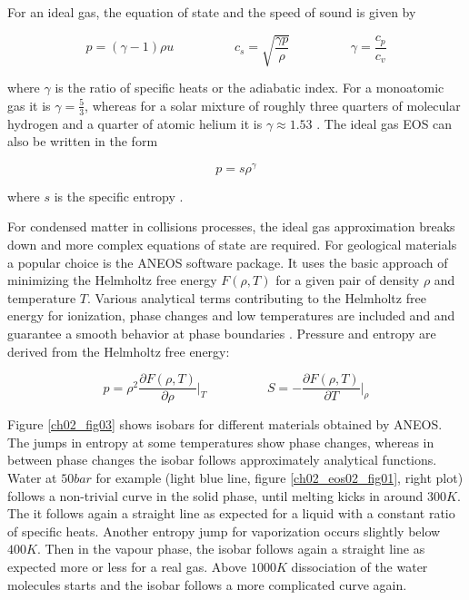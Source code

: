For an ideal gas, the equation of state and the speed of sound is given by

\begin{equation}
\label{ch02_sph01_eq036}
p = ( \gamma - 1 ) \rho u \hspace{2cm} c_s = \sqrt{ \frac{\gamma p}{\rho} } \hspace{2cm} \gamma = \frac{c_p}{c_v}
\end{equation}

where $\gamma$ is the ratio of specific heats or the adiabatic index. For a monoatomic gas it is $\gamma = \frac{5}{3}$, whereas for a solar mixture of roughly three quarters of molecular hydrogen and a quarter of atomic helium it is $\gamma \approx 1.53$ \citep{Nelson:2000p75}. The ideal gas EOS can also be written in the form 

\begin{equation}
p = s \rho^{\gamma}
\end{equation}

where $s$ is the specific entropy \citep{Springel:2005p51}.

For condensed matter in collisions processes, the ideal gas approximation breaks down and more complex equations of state are required. For geological materials a popular choice is the ANEOS software package. It uses the basic approach of minimizing the Helmholtz free energy $F(\rho, T)$ for a given pair of density $\rho$ and temperature $T$. Various analytical terms contributing to the Helmholtz free energy for ionization, phase changes and low temperatures are included and and guarantee a smooth behavior at phase boundaries \citep{Thompson:1990p1103}. Pressure and entropy are derived from the Helmholtz free energy:

\begin{equation}
\label{ch02_sph01_eq037}
p = \rho^2 \frac{\partial F(\rho, T)}{\partial \rho} \Big|_{T} \hspace{2cm} S = - \frac{\partial F(\rho, T)}{\partial T} \Big|_{\rho}
\end{equation}

Figure \ref{ch02_fig03} shows isobars for different materials obtained by ANEOS. The jumps in entropy at some temperatures show phase changes, whereas in between phase changes the isobar follows approximately analytical functions. Water at $50bar$ for example (light blue line, figure \ref{ch02_eos02_fig01}, right plot) follows a non-trivial curve in the solid phase, until melting kicks in around $300K$. The it follows again a straight line as expected for a liquid with a constant ratio of specific heats. Another entropy jump for vaporization occurs slightly below $400K$. Then in the vapour phase, the isobar follows again a straight line as expected more or less for a real gas. Above $1000K$ dissociation of the water molecules starts and the isobar follows a more complicated curve again.

